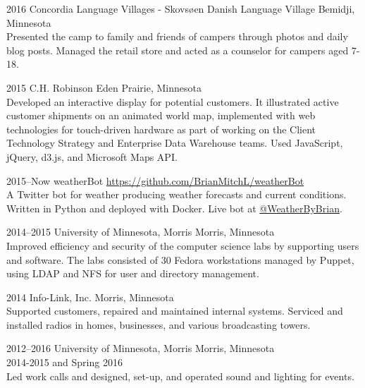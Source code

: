 \documentclass[]{cv-style} %
\begin{document}
\begin{entrylist}
\entry
{2016}
{Concordia Language Villages - Skovsøen Danish Language Village}
{Bemidji, Minnesota}
{ \\
Presented the camp to family and friends of campers through photos and daily blog posts.  Managed the retail store and acted as a counselor for campers aged 7-18.}



\entry
{2015}
{C.H. Robinson}
{Eden Prairie, Minnesota}
{ \\
Developed an interactive display for potential customers. It illustrated active customer shipments on an animated world map, implemented with web technologies for touch-driven hardware as part of working on the Client Technology Strategy and Enterprise Data Warehouse teams. Used JavaScript, jQuery, d3.js, and Microsoft Maps API.}


\entry
{2015--Now}
{weatherBot}
{\href{https://github.com/BrianMitchL/weatherBot}{https://github.com/BrianMitchL/weatherBot}}
{ \\
A Twitter bot for weather producing weather forecasts and current conditions. Written in Python and deployed with Docker. Live bot at \href{https://twitter.com/WeatherByBrian}{@WeatherByBrian}.}


\entry
{2014--2015}
{University of Minnesota, Morris}
{Morris, Minnesota}
{ \\
Improved efficiency and security of the computer science labs by supporting users and software. The labs consisted of 30 Fedora workstations managed by Puppet, using LDAP and NFS for user and directory management.}


\entry
{2014}
{Info-Link, Inc.}
{Morris, Minnesota}
{ \\
Supported customers, repaired and maintained internal systems. Serviced and installed radios in homes, businesses, and various broadcasting towers.}


\entry
{2012--2016}
{University of Minnesota, Morris}
{Morris, Minnesota}
{ \\
 2014-2015 and Spring 2016 \\
Led work calls and designed, set-­up, and operated sound and lighting for events.
}


\end{entrylist}
\end{document}
